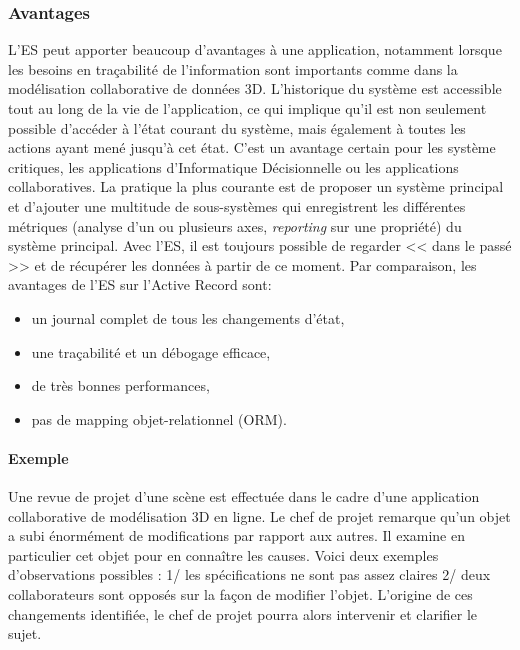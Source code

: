 \subsubsection{Avantages}
L'\gls{ES} peut apporter beaucoup d'avantages à une application, notamment 
lorsque les besoins en traçabilité de l'information sont importants comme dans 
la modélisation collaborative de données 3D.
L'historique du système est accessible tout au long de la vie de l'application, ce 
qui implique qu'il est non seulement possible d'accéder à l'état courant du 
système, mais également à toutes les actions ayant mené jusqu'à cet état. C'est 
un avantage certain pour les système critiques, les applications d'Informatique 
Décisionnelle ou les applications collaboratives. La pratique la plus 
courante est de proposer un système principal et d'ajouter une multitude de 
sous-systèmes qui enregistrent les différentes métriques (analyse d'un ou 
plusieurs axes, \textit{reporting} sur une propriété) du système principal. Avec 
l'\gls{ES}, il est toujours possible de regarder << dans le passé >> et de récupérer 
les données à partir de ce moment. Par comparaison, les avantages de 
l'\gls{ES} sur l'Active Record sont:
\begin{itemize}
	\item un journal complet de tous les changements d'état,
	\item une traçabilité et un débogage efficace,
	\item de très bonnes performances,
	\item pas de mapping objet-relationnel (ORM).
\end{itemize}

	
\paragraph{Exemple} 
Une revue de projet d'une scène est effectuée dans le cadre d'une application 
collaborative de modélisation 3D en ligne. Le chef de projet remarque qu'un 
objet a subi énormément de modifications par rapport aux autres. Il examine en 
particulier cet objet pour en connaître les causes. Voici deux exemples 
d'observations possibles : 1/ les spécifications ne sont pas assez claires 2/ 
deux collaborateurs sont opposés sur la façon de modifier l'objet. L'origine de 
ces changements identifiée, le chef de projet pourra alors intervenir et clarifier 
le sujet. 

